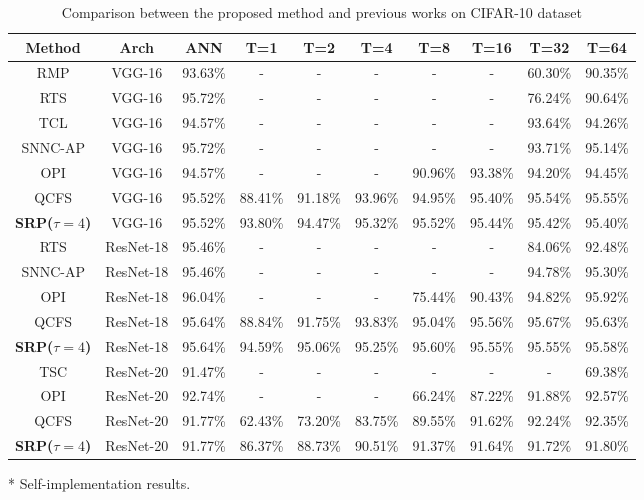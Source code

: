 \documentclass[letterpaper]{article} %
\begin{document}
\begin{table}[]
    \caption{Comparison between the proposed method and previous works on CIFAR-10 dataset}
    \renewcommand\arraystretch{1.15}
	\centering
        \begin{threeparttable}
	\begin{tabular}{cccccccccc}\hline

	Method & Arch & ANN & T=1 & T=2 & T=4 & T=8 & T=16 & T=32 & T=64\\ \hline

	RMP & VGG-16 & 93.63\% & - & - & - & - & - & 60.30\% & 90.35\% \\\hline
	RTS & VGG-16 & 95.72\% & - & - & - & - & - & 76.24\% & 90.64\% \\\hline
	TCL\tnote{*} & VGG-16 & 94.57\% & - & - & - & - & - & 93.64\% & 94.26\% \\\hline
	SNNC-AP & VGG-16 & 95.72\% & - & - & - & - & - & 93.71\% & 95.14\%  \\\hline
	OPI & VGG-16 & 94.57\% & - & - & - & 90.96\% & 93.38\% & 94.20\% & 94.45\%  \\\hline
	QCFS & VGG-16 & 95.52\% & 88.41\% & 91.18\% & 93.96\% & 94.95\% & 95.40\% & 95.54\% & 95.55\% \\\hline
	\textbf{SRP($\tau=4$)} & VGG-16 & 95.52\% & 93.80\% & 94.47\% & 95.32\% & 95.52\% & 95.44\% & 95.42\% & 95.40\% \\ \hline

	RTS & ResNet-18 & 95.46\% & - & - & - & - & - & 84.06\% & 92.48\% \\\hline
	SNNC-AP & ResNet-18 & 95.46\% & - & - & - & - & - & 94.78\% & 95.30\% \\\hline
	OPI & ResNet-18 & 96.04\% & - & - & - & 75.44\% & 90.43\% & 94.82\% & 95.92\%  \\\hline
	QCFS & ResNet-18 & 95.64\% & 88.84\% & 91.75\% & 93.83\% & 95.04\% & 95.56\% & 95.67\% & 95.63\% \\\hline
	\textbf{SRP($\tau=4$)} & ResNet-18 & 95.64\% & 94.59\% & 95.06\% & 95.25\% & 95.60\% & 95.55\% & 95.55\% & 95.58\% \\ \hline

	TSC & ResNet-20 & 91.47\% & - & - & - & - & - & - & 69.38\% \\\hline
	OPI & ResNet-20 & 92.74\% & - & - & - & 66.24\% & 87.22\% & 91.88\% & 92.57\%  \\\hline
	QCFS & ResNet-20 & 91.77\% & 62.43\% & 73.20\% & 83.75\% & 89.55\% & 91.62\% & 92.24\% & 92.35\% \\\hline
	\textbf{SRP($\tau=4$)} & ResNet-20 & 91.77\% & 86.37\% & 88.73\% & 90.51\% & 91.37\% & 91.64\% & 91.72\% & 91.80\% \\ \hline

	\end{tabular}
        \begin{tablenotes}
        \footnotesize
        \item[*] Self-implementation results.
        \end{tablenotes}
        \end{threeparttable}
	\label{table07}
\end{table}
\end{document}
